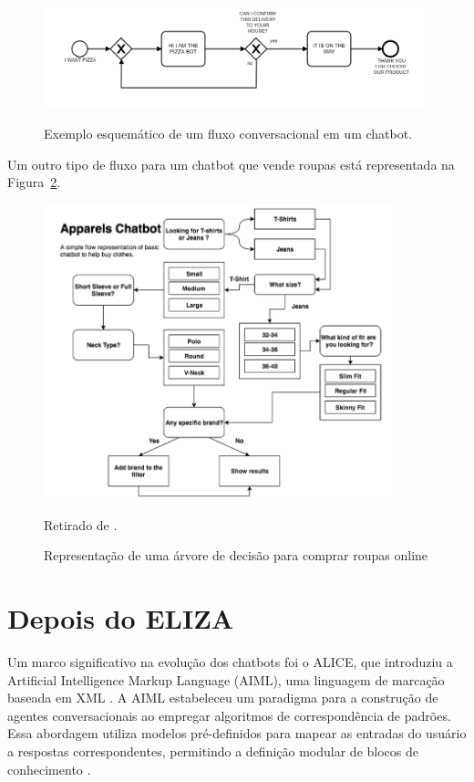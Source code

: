 \documentclass[14pt,a4paper,oneside]{book}
\begin{document}
\begin{figure}
	\centering
	\caption{Exemplo esquemático de um fluxo conversacional em um chatbot.}
	\includegraphics[width=1\linewidth]{./fig/fluxo.png}
	\label{fig:fluxo}
\end{figure}

Um outro tipo de fluxo para um chatbot que vende roupas está representada na Figura~\ref{fig:representacaodeumaarvore}.

\begin{figure}
\caption{Representação de uma árvore de decisão para comprar roupas online}
\vspace{0.5cm}
    \centering
   	\vspace*{0,2cm}
    \includegraphics[width=0.9\textwidth]{./fig/image14.png}
    \label{fig:representacaodeumaarvore}
	{
	
	Retirado de \cite{Raj2019}.}
\end{figure}

\section{Depois do ELIZA}

Um marco significativo na evolução dos chatbots foi o ALICE, que introduziu a Artificial Intelligence Markup Language (AIML), uma linguagem de marcação baseada em XML \cite{Wallace2000}. 
A AIML estabeleceu um paradigma para a construção de agentes conversacionais ao empregar algoritmos de correspondência de padrões. 
Essa abordagem utiliza modelos pré-definidos para mapear as entradas do usuário a respostas correspondentes, permitindo a definição modular de blocos de conhecimento \cite{Wallace2000}.
\end{document}
